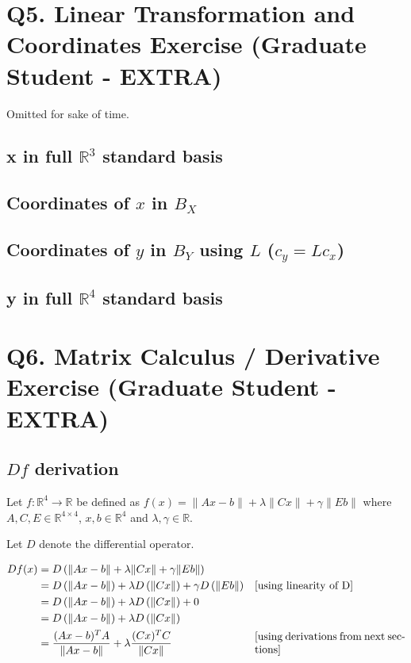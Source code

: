 \documentclass{article}
\begin{document}
    \section{Q5. Linear Transformation and Coordinates Exercise (Graduate Student - EXTRA)}
    
    Omitted for sake of time.

    \subsection{x in full $\mathbb{R}^3$ standard basis}
    \subsection{Coordinates of $x$ in $B_X$}
    \subsection{Coordinates of $y$ in $B_Y$ using $L$ ($c_y = Lc_x$)}
    \subsection{y in full $\mathbb{R}^4$ standard basis}


    \section{Q6. Matrix Calculus / Derivative Exercise (Graduate Student - EXTRA)}
    \subsection{ $Df$ derivation }
    Let $f: \mathbb{R}^4 \rightarrow \mathbb{R}$ be defined as $f(x) = \| Ax - b \| + \lambda \| Cx \| + \gamma \| Eb \|$ where $A, C, E \in \mathbb{R}^{4 \times 4}$, $x,b \in \mathbb{R}^4$ and $\lambda,\gamma \in \mathbb{R}$.

    Let $D$ denote the differential operator.

    \begin{align*}
    Df(x) &= D \left( \| Ax - b \| + \lambda \| Cx \| + \gamma \| Eb \| \right) &\\
    &= D \left( \| Ax - b \| \right) +  \lambda D \left( \| Cx \| \right) +  \gamma D \left( \| Eb \| \right) & \parbox[c]{0.4\linewidth}{[using linearity of D]}\\
    &= D \left( \| Ax - b \| \right) +  \lambda D \left( \| Cx \| \right) +  0 &\\
    &= D \left( \| Ax - b \| \right) +  \lambda D \left( \| Cx \| \right) &\\
    &= \frac{ (Ax-b)^T A }{\| Ax-b \| } + \lambda \frac{(Cx)^T C}{ \| Cx \| } & \parbox[c]{0.4\linewidth}{[using derivations from next sections]}
    \end{align*}
\end{document}
